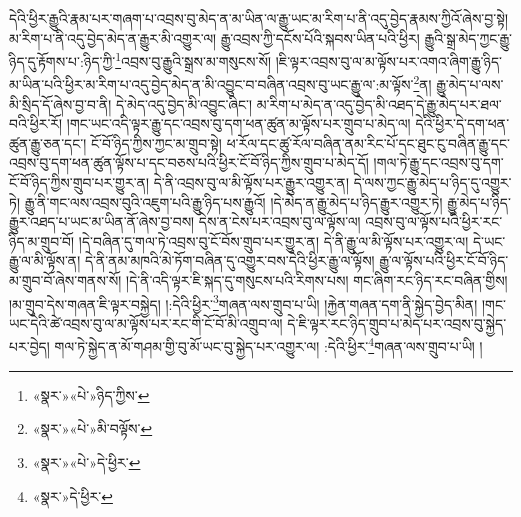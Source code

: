 དེའི་ཕྱིར་རྒྱུའི་རྣམ་པར་གཞག་པ་འབྲས་བུ་མེད་ན་མ་ཡིན་ལ་རྒྱུ་ཡང་མ་རིག་པ་ནི་འདུ་བྱེད་རྣམས་ཀྱིའོ་ཞེས་བྱ་སྟེ། མ་རིག་པ་ནི་འདུ་བྱེད་མེད་ན་རྒྱུར་མི་འགྱུར་ལ། རྒྱུ་འབྲས་ཀྱི་དངོས་པོའི་སྐབས་ཡིན་པའི་ཕྱིར། རྒྱུའི་སྒྲ་མེད་ཀྱང་རྒྱུ་ཉིད་དུ་རྟོགས་པ་:ཉིད་ཀྱི་\footnote{«སྣར་»«པེ་»ཉིད་ཀྱིས་}འབྲས་བུ་རྒྱུའི་སྒྲས་མ་གསུངས་སོ། །ཇི་ལྟར་འབྲས་བུ་ལ་མ་ལྟོས་པར་འགའ་ཞིག་རྒྱུ་ཉིད་མ་ཡིན་པའི་ཕྱིར་མ་རིག་པ་འདུ་བྱེད་མེད་ན་མི་འབྱུང་བ་བཞིན་འབྲས་བུ་ཡང་རྒྱུ་ལ་:མ་ལྟོས་\footnote{«སྣར་»«པེ་»མི་བལྟོས་}ན། རྒྱུ་མེད་པ་ལས་མི་སྲིད་དོ་ཞེས་བྱ་བ་ནི། དེ་མེད་འདུ་བྱེད་མི་འབྱུང་ཞིང་། མ་རིག་པ་མེད་ན་འདུ་བྱེད་མི་འཐད་དེ་རྒྱུ་མེད་པར་ཐལ་བའི་ཕྱིར་རོ། །གང་ཡང་འདི་ལྟར་རྒྱུ་དང་འབྲས་བུ་དག་ཕན་ཚུན་མ་ལྟོས་པར་གྲུབ་པ་མེད་ལ། དེའི་ཕྱིར་དེ་དག་ཕན་ཚུན་རྒྱུ་ཅན་དང་། ངོ་བོ་ཉིད་ཀྱིས་ཀྱང་མ་གྲུབ་སྟེ། ཕ་རོལ་དང་ཚུ་རོལ་བཞིན་ནམ་རིང་པོ་དང་ཐུང་ངུ་བཞིན་རྒྱུ་དང་འབྲས་བུ་དག་ཕན་ཚུན་ལྟོས་པ་དང་བཅས་པའི་ཕྱིར་ངོ་བོ་ཉིད་ཀྱིས་གྲུབ་པ་མེད་དོ། །གལ་ཏེ་རྒྱུ་དང་འབྲས་བུ་དག་ངོ་བོ་ཉིད་ཀྱིས་གྲུབ་པར་གྱུར་ན། དེ་ནི་འབྲས་བུ་ལ་མི་ལྟོས་པར་རྒྱུར་འགྱུར་ན། དེ་ལས་ཀྱང་རྒྱུ་མེད་པ་ཉིད་དུ་འགྱུར་ཏེ། རྒྱུ་ནི་གང་ལས་འབྲས་བུའི་འཇུག་པའི་རྒྱུ་ཉིད་པས་རྒྱུའོ། །དེ་མེད་ན་རྒྱུ་མེད་པ་ཉིད་རྒྱུར་འགྱུར་ཏེ། རྒྱུ་མེད་པ་ཉིད་རྒྱུར་འཐད་པ་ཡང་མ་ཡིན་ནོ་ཞེས་བྱ་བས། དེས་ན་ངེས་པར་འབྲས་བུ་ལ་ལྟོས་ལ། འབྲས་བུ་ལ་ལྟོས་པའི་ཕྱིར་རང་ཉིད་མ་གྲུབ་བོ། །དེ་བཞིན་དུ་གལ་ཏེ་འབྲས་བུ་ངོ་བོས་གྲུབ་པར་གྱུར་ན། དེ་ནི་རྒྱུ་ལ་མི་ལྟོས་པར་འགྱུར་ལ། དེ་ཡང་རྒྱུ་ལ་མི་ལྟོས་ན། དེ་ནི་ནམ་མཁའི་མེ་ཏོག་བཞིན་དུ་འགྱུར་བས་དེའི་ཕྱིར་རྒྱུ་ལ་ལྟོས། རྒྱུ་ལ་ལྟོས་པའི་ཕྱིར་ངོ་བོ་ཉིད་མ་གྲུབ་བོ་ཞེས་གནས་སོ། །དེ་ནི་འདི་ལྟར་ཇི་སྐད་དུ་གསུངས་པའི་རིགས་པས། གང་ཞིག་རང་ཉིད་རང་བཞིན་གྱིས། །མ་གྲུབ་དེས་གཞན་ཇི་ལྟར་བསྐྱེད། །:དེའི་ཕྱིར་\footnote{«སྣར་»«པེ་»དེ་ཕྱིར་}གཞན་ལས་གྲུབ་པ་ཡི། །རྐྱེན་གཞན་དག་ནི་སྐྱེད་བྱེད་མིན། །གང་ཡང་དེའི་ཚེ་འབྲས་བུ་ལ་མ་ལྟོས་པར་རང་གི་ངོ་བོ་མི་འགྲུབ་ལ། དེ་ཇི་ལྟར་རང་ཉིད་གྲུབ་པ་མེད་པར་འབྲས་བུ་སྐྱེད་པར་བྱེད། གལ་ཏེ་སྐྱེད་ན་མོ་གཤམ་གྱི་བུ་མོ་ཡང་བུ་སྐྱེད་པར་འགྱུར་ལ། :དེའི་ཕྱིར་\footnote{«སྣར་»དེ་ཕྱིར་}གཞན་ལས་གྲུབ་པ་ཡི། །
